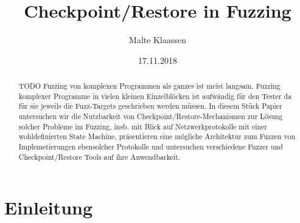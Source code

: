 \documentclass[a4paper]{article}
\begin{document}
\author{Malte Klaassen}
\date{17.11.2018}
\title{Checkpoint/Restore in Fuzzing}

\maketitle

\begin{abstract}
    TODO Fuzzing von komplexen Programmen als ganzes ist meist langsam, Fuzzing komplexer Programme in vielen kleinen Einzelblöcken ist aufwändig für den Tester da für sie jeweils die Fuzz-Targets geschrieben werden müssen. In diesem Stück Papier untersuchen wir die Nutzbarkeit von Checkpoint/Restore-Mechanismen zur Lösung solcher Probleme im Fuzzing, insb. mit Blick auf Netzwerkprotokolle mit einer wohldefinierten State Machine, präsentieren eine mögliche Architektur zum Fuzzen von Implemetierungen ebensolcher Protokolle und untersuchen verschiedene Fuzzer und Checkpoint/Restore Tools auf ihre Anwendbarkeit.
\end{abstract}

\tableofcontents

\section{Einleitung}
\end{document}
